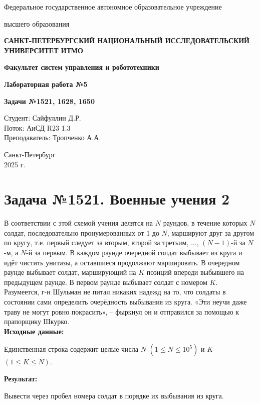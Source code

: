 \documentclass[a4paper,12pt]{article}
\begin{document}
\begin{titlepage}
    \centering
    {\large Федеральное государственное автономное образовательное учреждение\par}
    {\large высшего образования\par}
    {\bfseries САНКТ-ПЕТЕРБУРГСКИЙ НАЦИОНАЛЬНЫЙ ИССЛЕДОВАТЕЛЬСКИЙ УНИВЕРСИТЕТ ИТМО\par}
    {\bfseries Факультет систем управления и робототехники\par}
    \vfill
    {\Large \bfseries Лабораторная работа №5\par}
    {\Large \bfseries Задачи №1521, 1628, 1650\par}
    \vfill
    
    \begin{flushright}
        Студент: Сайфуллин Д.Р. \\
        Поток: АиСД R23 1.3 \\
        Преподаватель: Тропченко А.А.
    \end{flushright}
    \vfill
    Санкт-Петербург \\
    2025 г.
\end{titlepage}

\section*{Задача №1521. Военные учения 2}
В соответствии с этой схемой учения делятся на $N$ раундов, в течение которых $N$ солдат, последовательно пронумерованных от $1$ до $N$, маршируют друг за другом по кругу, т.е. первый следует за вторым, второй за третьим, ..., $(N-1)$-й за $N$-м, а $N$-й за первым. В каждом раунде очередной солдат выбывает из круга и идёт чистить унитазы, а оставшиеся продолжают маршировать. В очередном раунде выбывает солдат, марширующий на $K$ позиций впереди выбывшего на предыдущем раунде. В первом раунде выбывает солдат с номером $K$.\\[0.5em]
Разумеется, г-н Шульман не питал никаких надежд на то, что солдаты в состоянии сами определить очерёдность выбывания из круга. «Эти неучи даже траву не могут ровно покрасить», – фыркнул он и отправился за помощью к прапорщику Шкурко.\\[1em]
\textbf{Исходные данные:}
\begin{quotebox}
    Единственная строка содержит целые числа $N$ $(1 \leq N \leq 10^5)$ и $K$ $(1 \leq K \leq N)$.
\end{quotebox}
\textbf{Результат:}
\begin{quotebox}
    Вывести через пробел номера солдат в порядке их выбывания из круга.
\end{quotebox}
\end{document}

